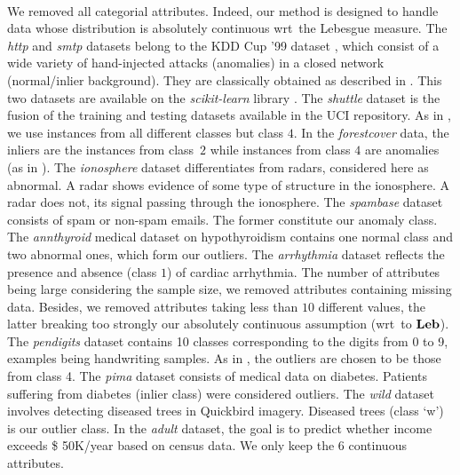 \paragraph{}
We removed all categorial attributes. Indeed, our method is designed to handle
data whose distribution is absolutely continuous \acs{wrt}~the Lebesgue
measure.
%
The \emph{http} and \emph{smtp} datasets belong to the \acs{KDD} Cup '99
dataset \citep{KDD99, Tavallaee2009}, which consist of a wide variety of
hand-injected attacks (anomalies) in a closed network (normal/inlier
background). They are classically obtained as described in
\citet{Yamanishi2000}. This two datasets are available on the
\emph{scikit-learn} library \citep{pedregosa2011scikit}. The \emph{shuttle}
dataset is the fusion of the training and testing datasets available in the
\acs{UCI} repository. As in \citet{Liu2008}, we use instances from all
different classes but class $4$.
In the \emph{forestcover} data, the inliers are the instances from class~$2$
while instances from class $4$ are anomalies (as in \citet{Liu2008}).
The \emph{ionosphere} dataset differentiates  from  radars,
considered here as abnormal. A  radar shows evidence of some type of
structure in the ionosphere. A  radar does not, its signal passing
through the ionosphere.
The \emph{spambase} dataset consists of spam or non-spam emails. The former
constitute our anomaly class.  The \emph{annthyroid} medical dataset on
hypothyroidism contains one normal class and two abnormal ones, which form our
outliers.
The \emph{arrhythmia} dataset reflects the presence and absence (class $1$) of
cardiac arrhythmia. The number of attributes being large considering the sample
size, we removed attributes containing missing data.  Besides, we removed
attributes taking less than $10$ different values, the latter breaking too
strongly our absolutely continuous assumption (\acs{wrt}~to $\mathbf{Leb}$).
The \emph{pendigits} dataset contains 10 classes corresponding to the digits
from 0 to 9, examples being handwriting samples. As in \citet{Schubert2012},
the outliers are chosen to be those from class 4.  The \emph{pima} dataset
consists of medical data on diabetes. Patients suffering from diabetes (inlier
class) were considered outliers.  The \emph{wild} dataset involves detecting
diseased trees in Quickbird imagery. Diseased trees (class `w') is our outlier
class.  In the \emph{adult} dataset, the goal is to predict whether income
exceeds \$ 50K/year based on census data. We only keep the 6 continuous
attributes.

